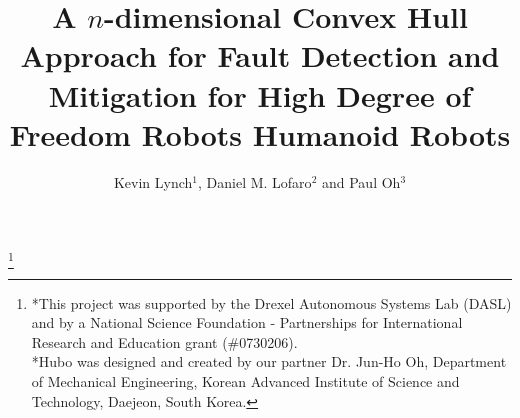 \documentclass[fleqn,10pt,twocolumn]{ICCAS2012}
\begin{document}
\title{A $n$-dimensional Convex Hull Approach for Fault Detection and Mitigation for High Degree of Freedom Robots Humanoid Robots}

\author{Kevin Lynch${}^{1}$, Daniel M. Lofaro${}^{2}$ and Paul Oh${}^{3}$}

\thanks{*This project was supported by the Drexel Autonomous Systems Lab (DASL) and by a National Science Foundation - Partnerships for International Research and Education grant (\#0730206). \\ 
*Hubo was designed and created by our partner Dr. Jun-Ho Oh, Department of Mechanical Engineering, Korean Advanced Institute of Science and Technology, Daejeon, South Korea.}%

\abstract{

}


\maketitle







%
%


%


%
%


%
{}



%
\end{document}
